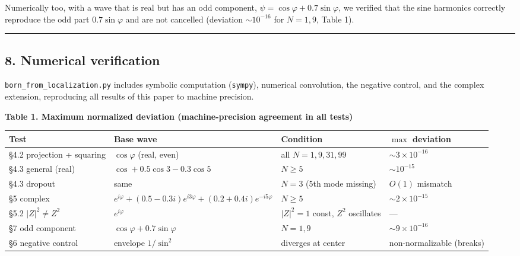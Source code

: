 \documentclass[
]{ltjsarticle}
\newcounter{none} %
\begin{document}
Numerically too, with a wave that is real but has an odd component,
\(\psi=\cos\varphi+0.7\sin\varphi\), we verified that the sine harmonics
correctly reproduce the odd part \(0.7\sin\varphi\) and are not
cancelled (deviation \(\sim10^{-16}\) for \(N=1,9\), Table 1).

\begin{center}\rule{0.5\linewidth}{0.5pt}\end{center}

\subsection{8. Numerical verification}\label{numerical-verification}

\texttt{born\_from\_localization.py} includes symbolic computation
(\texttt{sympy}), numerical convolution, the negative control, and the
complex extension, reproducing all results of this paper to machine
precision.

\textbf{Table 1. Maximum normalized deviation (machine-precision
agreement in all tests)}

{\def\LTcaptype{none} %
\begin{longtable}[]{@{}
  >{\raggedright\arraybackslash}p{}
  >{\raggedright\arraybackslash}p{}
  >{\raggedright\arraybackslash}p{}
  >{\raggedright\arraybackslash}p{}@{}}
\toprule\noalign{}
\begin{minipage}[b]{\linewidth}\raggedright
Test
\end{minipage} & \begin{minipage}[b]{\linewidth}\raggedright
Base wave
\end{minipage} & \begin{minipage}[b]{\linewidth}\raggedright
Condition
\end{minipage} & \begin{minipage}[b]{\linewidth}\raggedright
\(\max\) deviation
\end{minipage} \\
\midrule\noalign{}
\endhead
\bottomrule\noalign{}
\endlastfoot
§4.2 projection + squaring & \(\cos\varphi\) (real, even) & all
\(N=1,9,31,99\) & \(\sim3\times10^{-16}\) \\
§4.3 general (real) & \(\cos+0.5\cos3-0.3\cos5\) & \(N\ge5\) &
\(\sim10^{-15}\) \\
§4.3 dropout & same & \(N=3\) (5th mode missing) & \(O(1)\) mismatch \\
§5 complex &
\(e^{i\varphi}+(0.5{-}0.3i)e^{i3\varphi}+(0.2{+}0.4i)e^{-i5\varphi}\) &
\(N\ge5\) & \(\sim2\times10^{-15}\) \\
§5.2 \(|Z|^2\ne Z^2\) & \(e^{i\varphi}\) & \(|Z|^2{=}1\) const, \(Z^2\)
oscillates & --- \\
§7 odd component & \(\cos\varphi+0.7\sin\varphi\) & \(N=1,9\) &
\(\sim9\times10^{-16}\) \\
§6 negative control & envelope \(1/\sin^2\) & diverges at center &
non-normalizable (breaks) \\
\end{longtable}
}
\end{document}
